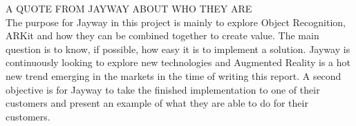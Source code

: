 A QUOTE FROM JAYWAY ABOUT WHO THEY ARE \\

The purpose for Jayway in this project is mainly to explore Object Recognition, ARKit and how they can be combined together to create value. The main question is to know, if possible, how easy it is to implement a solution.
Jayway is continuously looking to explore new technologies and Augmented Reality is a hot new trend emerging in the markets in the time of writing this report.
A second objective is for Jayway to take the finished implementation to one of their customers and
present an example of what they are able to do for their customers.

\newpage
